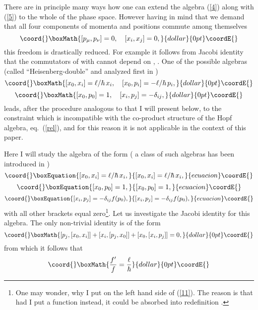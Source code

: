 \documentclass[a4paper,a4paper]{article}
\begin{document}
There are in principle many ways how one can extend the algebra (\ref{4}) along with (\ref{5}) to the whole of the phase space. However having in mind that we demand that all four components of momenta and positions \coordHE{}   commute among themselves
$$\coord{}\boxMath{ [ p_\mu, p_\nu] =0, \quad [ x_i, x_j] =0, }{dollar}{0pt}\coordE{}$$ this freedom is drastically reduced. For example it follows from Jacobi identity that the commutators of \coordHE{} with \coordHE{}  cannot depend on \coordHE{}, \coordHE{}. One of the possible algebras (called ``Heisenberg-double'' and analyzed first in \cite{luno})
$$\coord{}\boxMath{
  [ x_0, x_i] = \ell/\hbar \, x_i, \quad
  [ x_0, p_i] = - \ell/\hbar \, p_i,
}{dollar}{0pt}\coordE{}$$  $$\coord{}\boxMath{
  [ x_0, p_0] = 1,\quad
  [ x_i, p_j] = -\delta_{ij},}{dollar}{0pt}\coordE{}$$
leads, after the procedure analogous to that I will present below, to the constraint \myHighlight{$2\hbar =\ell\kappa$}\coordHE{} which is incompatible with the co-product structure of the Hopf algebra, eq.~(\ref{rel}), and for this reason it is not applicable in the context of this paper.

Here I will study the algebra of the form ( a class of such algebras has been introduced in \cite{luruza})
\begin{equation}\coord{}\boxEquation{\label{6}
  [ x_0, x_i] = \ell/\hbar \, x_i,
}{[ x_0, x_i] = \ell/\hbar \, x_i,
}{ecuacion}\coordE{}\end{equation}
\begin{equation}\coord{}\boxEquation{\label{7}
  [ x_0, p_0] = 1,
}{[ x_0, p_0] = 1,
}{ecuacion}\coordE{}\end{equation}
\begin{equation}\coord{}\boxEquation{\label{8}
  [ x_i, p_j] = -\delta_{ij}f(p_0),
}{[ x_i, p_j] = -\delta_{ij}f(p_0),
}{ecuacion}\coordE{}\end{equation}
with all other brackets equal zero\footnote{One may wonder, why I put \coordHE{} on the left hand side of (\ref{11}). The reason is that had I put a function \coordHE{} instead, it could be absorbed into redefinition \coordHE{}.}. Let us investigate the Jacobi identity for this algebra. The only non-trivial identity is of the form
$$\coord{}\boxMath{ [p_j, [x_0, x_i]] + [x_i, [p_j, x_0]] + [x_0, [x_i, p_j]] =0,}{dollar}{0pt}\coordE{}$$
from which it follows that $$\coord{}\boxMath{\frac{f'}{f}=\frac\ell\hbar}{dollar}{0pt}\coordE{}$$
\end{document}
